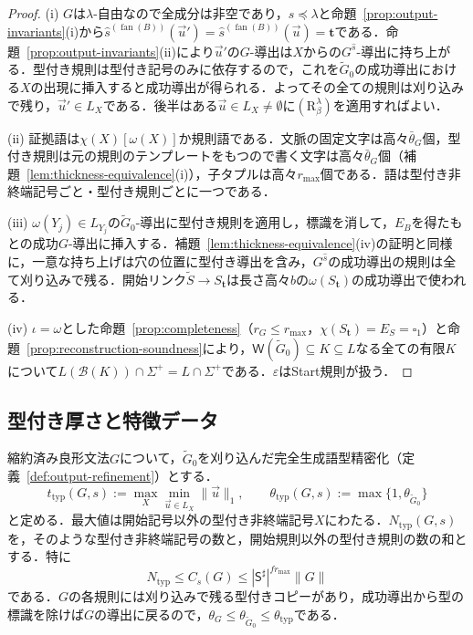 \documentclass[11pt,a4paper]{ltjsarticle}
\numberwithin{equation}{section}
\theoremstyle{plain}
\theoremstyle{definition}
\theoremstyle{remark}
\newcommand{\Wit}{\mathsf{W}}
\newcommand{\tuple}[1]{\vec{#1}}
\newcommand{\blank}{\square}
\newcommand{\eps}{\varepsilon}
\newcommand{\fan}{\operatorname{fan}}
\begin{document}
\begin{proof}
(i) $G$は$\lambda$-自由なので全成分は非空であり，$s\preceq\lambda$と命題~\ref{prop:output-invariants}(i)から$\widehat s^{(\fan(B))}(\tuple u')=\widehat s^{(\fan(B))}(\tuple u)=\mathbf t$である．命題~\ref{prop:output-invariants}(ii)により$\tuple u'$の$G$-導出は$X$からの$G^{\widehat s}$-導出に持ち上がる．型付き規則は型付き記号のみに依存するので，これを$\widetilde G_0$の成功導出における$X$の出現に挿入すると成功導出が得られる．よってその全ての規則は刈り込みで残り，$\tuple u'\in L_X$である．後半はある$\tuple u\in L_X\ne\emptyset$に$(\mathrm R_\beta^\lambda)$を適用すればよい．

(ii) 証拠語は$\chi(X)[\omega(X)]$か規則語である．文脈の固定文字は高々$\bar\theta_G$個，型付き規則は元の規則のテンプレートをもつので書く文字は高々$\bar\theta_G$個（補題~\ref{lem:thickness-equivalence}(i)），子タプルは高々$r_{\max}$個である．語は型付き非終端記号ごと・型付き規則ごとに一つである．

(iii) $\omega(Y_j)\in L_{Y_j}$の$\widetilde G_0$-導出に型付き規則を適用し，標識を消して，$E_B$を得たもとの成功$G$-導出に挿入する．補題~\ref{lem:thickness-equivalence}(iv)の証明と同様に，一意な持ち上げは穴の位置に型付き導出を含み，$G^{\widehat s}$の成功導出の規則は全て刈り込みで残る．開始リンク$\widetilde S\to S_{\mathbf t}$は長さ高々$b$の$\omega(S_{\mathbf t})$の成功導出で使われる．

(iv) $\iota=\omega$とした命題~\ref{prop:completeness}（$r_G\le r_{\max}$，$\chi(S_{\mathbf t})=E_S=\blank_1$）と命題~\ref{prop:reconstruction-soundness}により，$\Wit(\widetilde G_0)\subseteq K\subseteq L$なる全ての有限$K$について$L(\mathcal B(K))\cap\Sigma^+=L\cap\Sigma^+$である．$\eps$はStart規則が扱う．
\end{proof}

\subsection{型付き厚さと特徴データ}
\label{subsec:typed-thickness}

縮約済み良形文法$G$について，$\widetilde G_0$を刈り込んだ完全生成語型精密化（定義~\ref{def:output-refinement}）とする．
\[
 t_{\mathrm{typ}}(G,s):=
 \max_X\min_{\tuple u\in L_X}\|\tuple u\|_1,\qquad
 \theta_{\mathrm{typ}}(G,s):=\max\{1,\theta_{\widetilde G_0}\}
\]
と定める．最大値は開始記号以外の型付き非終端記号$X$にわたる．$N_{\mathrm{typ}}(G,s)$を，そのような型付き非終端記号の数と，開始規則以外の型付き規則の数の和とする．特に
\[
 N_{\mathrm{typ}}\le C_s(G)\le|\mathsf S^\sharp|^{fr_{\max}}\|G\|
\]
である．$G$の各規則には刈り込みで残る型付きコピーがあり，成功導出から型の標識を除けば$G$の導出に戻るので，$\theta_G\le\theta_{\widetilde G_0}\le\theta_{\mathrm{typ}}$である．
\end{document}
